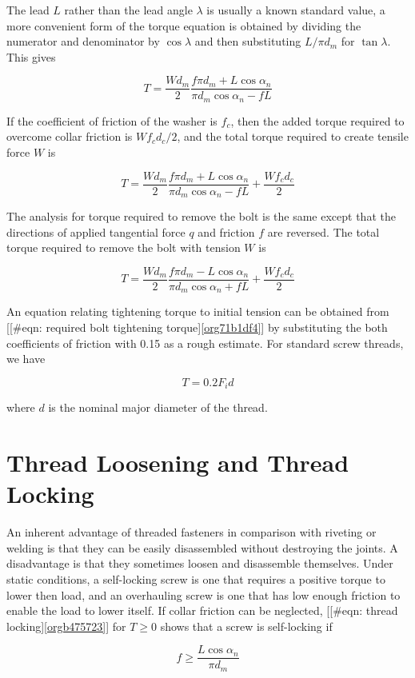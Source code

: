 \documentclass[a4paper,openany,12pt]{book}
\begin{document}
{{The lead \(L\) rather than the lead angle \(\lambda\) is usually a known
standard value, a more convenient form of the torque equation is
obtained by dividing the numerator and denominator by \(\cos \lambda\) and
then substituting \(L/\pi d_m\) for \(\tan \lambda\). This gives

$$T = \frac{Wd_m}{2}\frac{f\pi d_m + L\cos \alpha_n}{\pi d_m\cos \alpha_n - fL}$$

If the coefficient of friction of the washer is \(f_c\), then the added
torque required to overcome collar friction is \(Wf_cd_c/2\), and the
total torque required to create tensile force \(W\) is

$$T = \frac{Wd_m}{2}\frac{f\pi d_m + L\cos \alpha_n}{\pi d_m\cos \alpha_n - fL} + \frac{Wf_cd_c}{2}$$

The analysis for torque required to remove the bolt is the same except
that the directions of applied tangential force \(q\) and friction \(f\) are
reversed. The total torque required to remove the bolt with tension \(W\)
is

$$T = \frac{Wd_m}{2}\frac{f\pi d_m - L\cos \alpha_n}{\pi d_m\cos \alpha_n + fL} + \frac{Wf_cd_c}{2}$$

An equation relating tightening torque to initial tension can be
obtained from
[[\#eqn: required bolt tightening torque]\ref{org71b1df4}]
by substituting the both coefficients of friction with 0.15 as a rough
estimate. For standard screw threads, we have

$$T = 0.2F_id$$

where \(d\) is the nominal major diameter of the thread.

\section{Thread Loosening and Thread Locking}
\label{sec:org7d86604}
An inherent advantage of threaded fasteners in comparison with riveting
or welding is that they can be easily disassembled without destroying
the joints. A disadvantage is that they sometimes loosen and disassemble
themselves. Under static conditions, a self-locking screw is one that
requires a positive torque to lower then load, and an overhauling screw
is one that has low enough friction to enable the load to lower itself.
If collar friction can be neglected,
[[\#eqn: thread locking]\ref{orgb475723}] for \(T \geqslant 0\)
shows that a screw is self-locking if

$$f \geqslant \frac{L\cos \alpha_n}{\pi d_m}$$

}}
\end{document}
